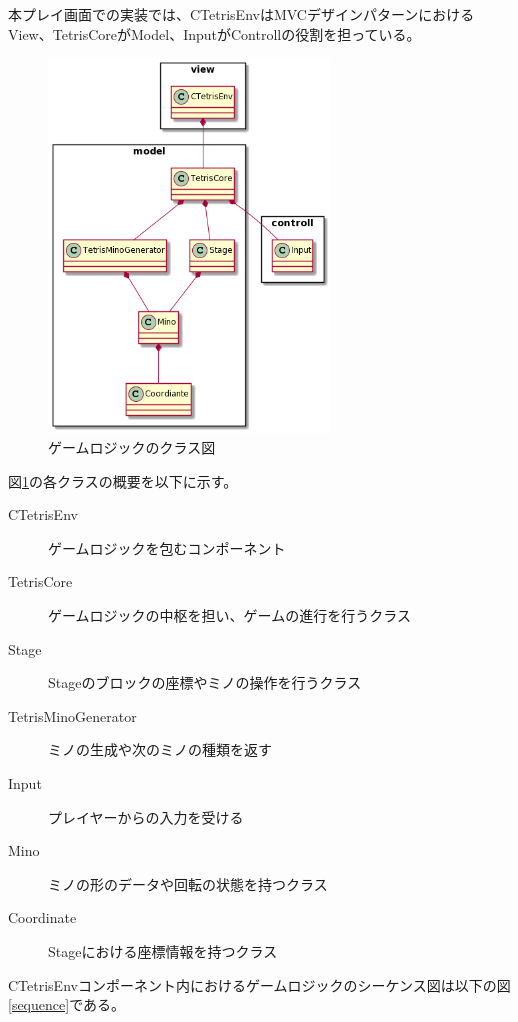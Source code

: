\documentclass[a4paper,11pt]{jsarticle}
\begin{document}
本プレイ画面での実装では、CTetrisEnvはMVCデザインパターンにおけるView、TetrisCoreがModel、InputがControllの役割を担っている。

\begin{figure}[H]
\begin{center}
\includegraphics[width=75mm]{logic.png}
\caption{ゲームロジックのクラス図}
\label{logic}
\end{center}
\end{figure}

図\ref{logic}の各クラスの概要を以下に示す。
\begin{description}
\item[CTetrisEnv] ゲームロジックを包むコンポーネント
\item[TetrisCore] ゲームロジックの中枢を担い、ゲームの進行を行うクラス
\item[Stage] Stageのブロックの座標やミノの操作を行うクラス
\item[TetrisMinoGenerator] ミノの生成や次のミノの種類を返す
\item[Input] プレイヤーからの入力を受ける
\item[Mino] ミノの形のデータや回転の状態を持つクラス
\item[Coordinate] Stageにおける座標情報を持つクラス  
\end{description}

CTetrisEnvコンポーネント内におけるゲームロジックのシーケンス図は以下の図\ref{sequence}である。
\end{document}
